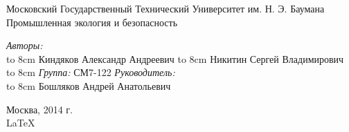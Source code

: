 \documentclass{article}
\begin{document}
\begin{titlepage}
\begin{center}
    {\large Московский Государственный Технический Университет им. Н. Э. Баумана}
    \\[5cm]
    {\Large Промышленная экология и безопасность}
    \\[5cm]

    \begin{flushright}
        \begin{minipage}{0.5\textwidth}
            \begin{flushleft}
                \textit{Авторы:} \\
                \hbox to 8cm {Киндяков Александр Андреевич \hfil \underline{\hspace{2cm} } }
                \vspace{\baselineskip}
                \hbox to 8cm {Никитин Сергей Владимирович \hfil \underline{\hspace{2cm} } }
                \vspace{\baselineskip}
                \hbox to 8cm {\textit{Группа:} \hfil СМ7-122}
                \vspace{2cm}
                \textit{Руководитель:} \\
                \hbox to 8cm {Бошляков Андрей Анатольевич \hfil \underline{\hspace{2cm} } }
            \end{flushleft}
        \end{minipage}
    \end{flushright}

    \vfill %
    Москва, 2014 г. \\
    \LaTeX
\end{center}
\end{titlepage}

\tableofcontents



\newpage
\begin{thebibliography}{30}
    
\end{thebibliography}
\end{document}
